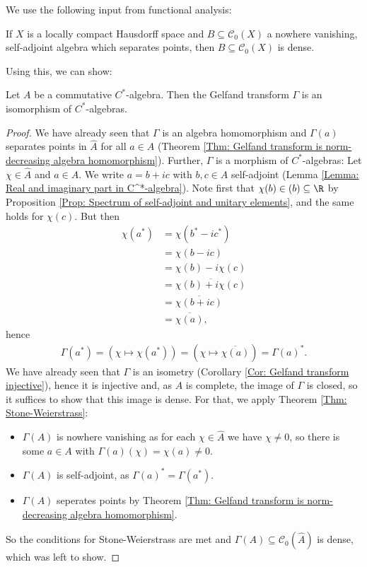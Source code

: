 \documentclass[american]{scrartcl}
\newcommand{\cC}{\mathcal{C}}
\let\sp\relax
\newcommand{\conj}[1]{\overline{#1}}
\begin{document}
We use the following input from functional analysis:
\begin{theorem}\label{Thm: Stone-Weierstrass}
	If $X$ is a locally compact Hausdorff space and $B\subseteq\cC_0(X)$ a nowhere vanishing, self-adjoint algebra which separates points, then $B\subseteq\cC_0(X)$ is dense.
\end{theorem}
Using this, we can show:
\begin{theorem}
	Let $A$ be a commutative $C^*$-algebra. Then the Gelfand transform $\Gamma$ is an isomorphism of $C^*$-algebras.
\end{theorem}
\begin{proof}
	We have already seen that $\Gamma$ is an algebra homomorphism and $\Gamma(a)$ separates points in $\hat{A}$ for all $a\in A$ (Theorem \ref{Thm: Gelfand transform is norm-decreasing algebra homomorphism}). Further, $\Gamma$ is a morphism of $C^*$-algebras: Let $\chi\in \hat{A}$ and $a\in A$. We write $a=b+ic$ with $b,c\in A$ self-adjoint (Lemma \ref{Lemma: Real and imaginary part in C^*-algebra}). Note first that $\chi(b)\in\sp(b)\subseteq \R$ by Proposition \ref{Prop: Spectrum of self-adjoint and unitary elements}, and the same holds for $\chi(c)$. But then
	\begin{align*}
		\chi(a^*)&=\chi(b^*-ic^*)\\
		&=\chi(b-ic)\\
		&=\chi(b)-i\chi(c)\\
		&=\conj{\chi(b)+i\chi(c)}\\
		&=\conj{\chi(b+ic)}\\
		&=\conj{\chi(a)},
	\end{align*}
	hence
	\begin{align*}
		\Gamma(a^*)=(\chi\mapsto\chi(a^*))=(\chi\mapsto \conj{\chi(a)})=\Gamma(a)^*.
	\end{align*}
	We have already seen that $\Gamma$ is an isometry (Corollary \ref{Cor: Gelfand transform injective}), hence it is injective and, as $A$ is complete, the image of $\Gamma$ is closed, so it suffices to show that this image is dense. For that, we apply Theorem \ref{Thm: Stone-Weierstrass}:
	\begin{itemize}
		\item $\Gamma(A)$ is nowhere vanishing as for each $\chi\in \hat{A}$ we have $\chi\neq 0$, so there is some $a\in A$ with $\Gamma(a)(\chi)=\chi(a)\neq 0$.
		\item $\Gamma(A)$ is self-adjoint, as $\Gamma(a)^*=\Gamma(a^*)$.
		\item $\Gamma(A)$ seperates points by Theorem \ref{Thm: Gelfand transform is norm-decreasing algebra homomorphism}.
	\end{itemize}
	So the conditions for Stone-Weierstrass are met and $\Gamma(A)\subseteq \cC_0(\hat{A})$ is dense, which was left to show.
\end{proof}
\end{document}
